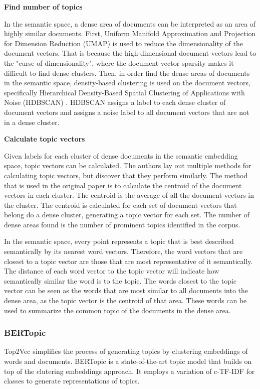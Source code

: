 \documentclass{article}
\begin{document}
\textbf{Find number of topics}

In the semantic space, a dense area of documents can be interpreted as an area of highly similar documents. First, Uniform Manifold Approximation and Projection for Dimension Reduction (UMAP) \cite{mcinnes_umap_2020} is used to reduce the dimensionality of the document vectors. That is because the high-dimensional document vectors lead to the "curse of dimensionality", where the document vector sparsity makes it difficult to find dense clusters. Then, in order find the dense areas of documents in the semantic space, density-based clustering is used on the document vectors, specifically Hierarchical Density-Based Spatial Clustering of Applications with Noise (HDBSCAN) \cite{campello_density-based_2013, mcinnes_accelerated_2017, mcinnes_hdbscan_2017}. HDBSCAN assigns a label to each dense cluster of document vectors and assigns a noise label to all document vectors that are not in a dense cluster.


\textbf{Calculate topic vectors}

Given labels for each cluster of dense documents in the semantic embedding space, topic vectors can be calculated. The authors lay out multiple methods for calculating topic vectors, but discover that they perform similarly. The method that is used in the original paper is to calculate the centroid of the document vectors in each cluster. The centroid is the average of all the document vectors in the cluster. The centroid is calculated for each set of document vectors that belong do a dense cluster, generating a topic vector for each set. The number of dense areas found is the number of prominent topics identified in the corpus.

In the semantic space, every point represents a topic that is best described semantically by its nearest word vectors. Therefore, the word vectors that are closest to a topic vector are those that are most representative of it semantically. The distance of each word vector to the topic vector will indicate how semantically similar the word is to the topic. The words closest to the topic vector can be seen as the words that are most similar to all documents into the dense area, as the topic vector is the centroid of that area. These words can be used to summarize the common topic of the documents in the dense area.

\subsubsection{BERTopic}
Top2Vec simplifies the process of generating topics by clustering embeddings of words and documents. BERTopic \cite{grootendorst_bertopic_2022} is a state-of-the-art topic model that builds on top of the clutering embeddings approach. It employs a variation of c-TF-IDF for classes to generate representations of topics.
\end{document}
